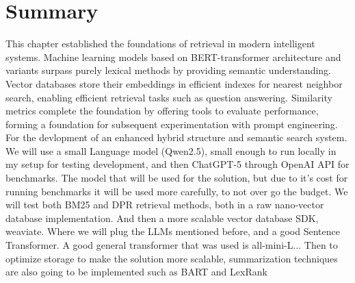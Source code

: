 \section{Summary}
This chapter established the foundations of retrieval in modern intelligent systems. Machine learning models based on \gls{BERT}-transformer \cite{bertpretrainingdeepbidirectional} architecture and variants surpass purely lexical methods by providing semantic understanding. Vector databases store their embeddings in efficient indexes for nearest neighbor search, enabling efficient retrieval tasks such as question answering. Similarity metrics complete the foundation by offering tools to evaluate performance, forming a foundation for subsequent experimentation with prompt engineering.
For the devlopment of an enhanced hybrid structure and semantic search system. We will use a small Language model (Qwen2.5), small enough to run locally in my setup for testing development, and then ChatGPT-5 through OpenAI API for benchmarks. The model that will be used for the solution, but due to it's cost for running benchmarks it will be used more carefully, to not over go the budget. We will test both BM25 and DPR retrieval methods, both in a raw nano-vector database implementation. And then a more scalable vector database SDK, weaviate. Where we will plug the \glspl{LLM} mentioned before, and a good Sentence Transformer. A good general transformer that was used is all-mini-L... Then to optimize storage to make the solution more scalable, summarization techniques are also going to be implemented such as BART and LexRank


